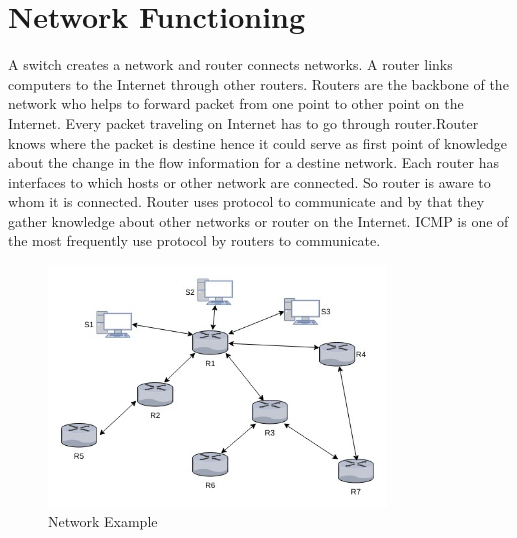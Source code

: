 \documentclass[10pt,oneside,a4paper]{article}
\begin{document}
\section{Network Functioning}
A switch creates a network and router connects networks. A router links computers to the Internet through other routers. Routers are the backbone of the network who helps to forward packet from one point to other point on the Internet. Every packet traveling on Internet has to go through router\cite{swithcrouter}.Router knows where the packet is destine hence it could serve as first point of knowledge about the change in the flow information for a destine network. Each router has interfaces to which hosts or other network are connected. So router is aware to whom it is connected. Router uses protocol to communicate and by that they gather knowledge about other networks or router on the Internet. ICMP\cite{icmp} is one of the most frequently use protocol by routers to communicate.\par

\begin{figure}[H]
\centering
\includegraphics[width=0.80\textwidth]{Routers}
\caption{Network Example} \label{fig:routers}
\end{figure}
\end{document}
